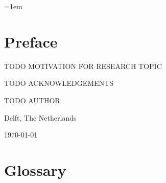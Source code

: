 \documentclass[11pt,twoside,a4paper,openright]{report}
\begin{document}
\pagestyle{empty}




\hoffset=1.63cm
\oddsidemargin=0in
\evensidemargin=0in
\textwidth=5in

\parindent=1em

\cleardoublepage

\pagestyle{plain}
\setcounter{page}{1}





\cleardoublepage

%




\chapter*{Preface}
TODO MOTIVATION FOR RESEARCH TOPIC

\vspace{1\baselineskip}

\noindent
TODO ACKNOWLEDGEMENTS

\vspace{1\baselineskip}

\noindent
TODO AUTHOR

\vspace{1\baselineskip}

\noindent
Delft, The Netherlands

\noindent
\today


\cleardoublepage


\chapter*{Glossary}








\cleardoublepage
\end{document}
